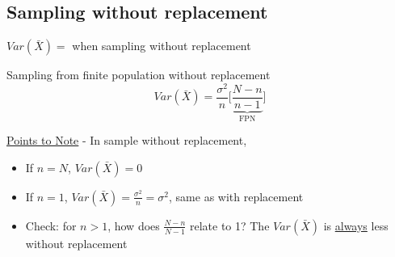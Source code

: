 \subsection*{Sampling without replacement}
$Var(\bar{X}) =$ when sampling without replacement\\
\begin{theorem}
	Sampling from finite population without replacement
	\begin{equation*}
		Var(\bar{X}) = \frac{\sigma^2}{n} \bigg[ \underbrace{\frac{N-n}{n-1} }_{\text{FPN}} \bigg] \tag{finite population correction}
	\end{equation*}
\end{theorem}
\underline{Points to Note} - In sample without replacement,
\begin{itemize}[label={--}]
	\item If $n = N$, $Var(\bar{X}) = 0$
	\item If $n=1$, $Var(\bar{X}) = \frac{\sigma^2}{n} = \sigma^2$, same as with replacement
	\item Check: for $n > 1$, how does $\frac{N-n}{N-1}$ relate to 1? The $Var(\bar{X})$ is \underline{always} less without replacement
\end{itemize}
